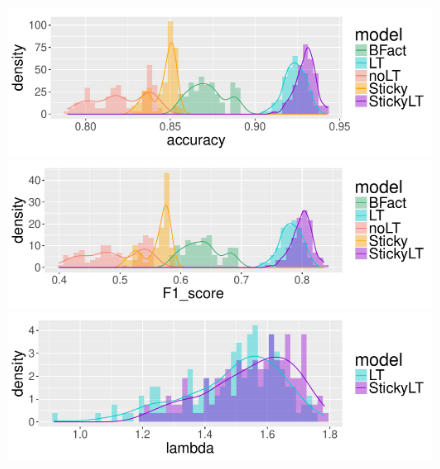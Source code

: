 \begin{figure}[tb]
  \centering
  \begin{minipage}{0.75\textwidth}
  \includegraphics[width = \textwidth]{fig/cocktail/synth_s16_m12/hyper_h/h10.0_nocs_cp0/a5b0p01/accuracy_density.pdf}
\end{minipage}

\begin{minipage}{0.75\textwidth}
  \includegraphics[width = \textwidth]{fig/cocktail/synth_s16_m12/hyper_h/h10.0_nocs_cp0/a5b0p01/F1_score_density.pdf}
\end{minipage}

\begin{minipage}{0.75\textwidth}
  \includegraphics[width = \textwidth]{fig/cocktail/synth_s16_m12/hyper_h/h10.0_nocs_cp0/a5b0p01/lambda_density.pdf}
\end{minipage}


\end{figure}
